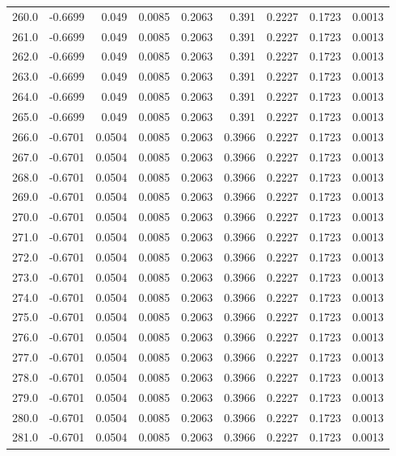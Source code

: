 \begin{longtable}{lrrrrrrrr}
260.0 & -0.6699 & 0.049 & 0.0085 & 0.2063 & 0.391 & 0.2227 & 0.1723 & 0.0013 \\
261.0 & -0.6699 & 0.049 & 0.0085 & 0.2063 & 0.391 & 0.2227 & 0.1723 & 0.0013 \\
262.0 & -0.6699 & 0.049 & 0.0085 & 0.2063 & 0.391 & 0.2227 & 0.1723 & 0.0013 \\
263.0 & -0.6699 & 0.049 & 0.0085 & 0.2063 & 0.391 & 0.2227 & 0.1723 & 0.0013 \\
264.0 & -0.6699 & 0.049 & 0.0085 & 0.2063 & 0.391 & 0.2227 & 0.1723 & 0.0013 \\
265.0 & -0.6699 & 0.049 & 0.0085 & 0.2063 & 0.391 & 0.2227 & 0.1723 & 0.0013 \\
266.0 & -0.6701 & 0.0504 & 0.0085 & 0.2063 & 0.3966 & 0.2227 & 0.1723 & 0.0013 \\
267.0 & -0.6701 & 0.0504 & 0.0085 & 0.2063 & 0.3966 & 0.2227 & 0.1723 & 0.0013 \\
268.0 & -0.6701 & 0.0504 & 0.0085 & 0.2063 & 0.3966 & 0.2227 & 0.1723 & 0.0013 \\
269.0 & -0.6701 & 0.0504 & 0.0085 & 0.2063 & 0.3966 & 0.2227 & 0.1723 & 0.0013 \\
270.0 & -0.6701 & 0.0504 & 0.0085 & 0.2063 & 0.3966 & 0.2227 & 0.1723 & 0.0013 \\
271.0 & -0.6701 & 0.0504 & 0.0085 & 0.2063 & 0.3966 & 0.2227 & 0.1723 & 0.0013 \\
272.0 & -0.6701 & 0.0504 & 0.0085 & 0.2063 & 0.3966 & 0.2227 & 0.1723 & 0.0013 \\
273.0 & -0.6701 & 0.0504 & 0.0085 & 0.2063 & 0.3966 & 0.2227 & 0.1723 & 0.0013 \\
274.0 & -0.6701 & 0.0504 & 0.0085 & 0.2063 & 0.3966 & 0.2227 & 0.1723 & 0.0013 \\
275.0 & -0.6701 & 0.0504 & 0.0085 & 0.2063 & 0.3966 & 0.2227 & 0.1723 & 0.0013 \\
276.0 & -0.6701 & 0.0504 & 0.0085 & 0.2063 & 0.3966 & 0.2227 & 0.1723 & 0.0013 \\
277.0 & -0.6701 & 0.0504 & 0.0085 & 0.2063 & 0.3966 & 0.2227 & 0.1723 & 0.0013 \\
278.0 & -0.6701 & 0.0504 & 0.0085 & 0.2063 & 0.3966 & 0.2227 & 0.1723 & 0.0013 \\
279.0 & -0.6701 & 0.0504 & 0.0085 & 0.2063 & 0.3966 & 0.2227 & 0.1723 & 0.0013 \\
280.0 & -0.6701 & 0.0504 & 0.0085 & 0.2063 & 0.3966 & 0.2227 & 0.1723 & 0.0013 \\
281.0 & -0.6701 & 0.0504 & 0.0085 & 0.2063 & 0.3966 & 0.2227 & 0.1723 & 0.0013 \\

\end{longtable}
